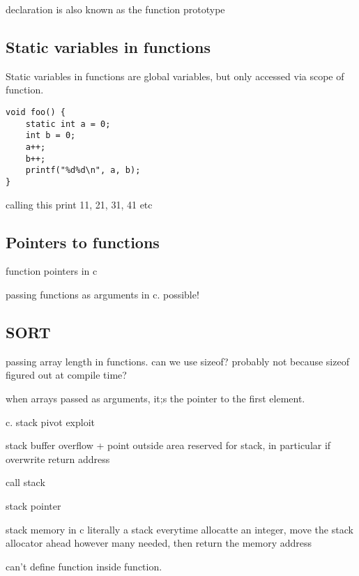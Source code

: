 declaration is also known as the function prototype

\subsection{Static variables in functions}

Static variables in functions are global variables, but only accessed via scope of function.

\begin{verbatim}
void foo() {
    static int a = 0;
    int b = 0;
    a++;
    b++;
    printf("%d%d\n", a, b);
}
\end{verbatim}

calling this print 11, 21, 31, 41 etc

\subsection{Pointers to functions}

function pointers in c

passing functions as arguments in c. possible!

\subsection{SORT}

passing array length in functions. can we use sizeof? probably not because sizeof figured out at compile time?

when arrays passed as arguments, it;s the pointer to the first element.

c. stack pivot exploit

stack buffer overflow
+ point outside area reserved for stack, in particular if overwrite return address

call stack

stack pointer

stack memory in c
literally a stack
everytime allocatte an integer, move the stack allocator ahead however many needed, then return the memory address

can't define function inside function.

